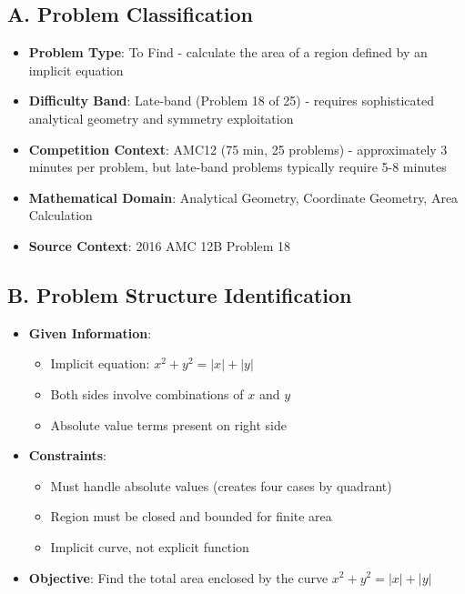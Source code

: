 \documentclass[]{article}
\begin{document}
\begin{problemconfigbox}
\subsection*{A. Problem Classification}
\begin{itemize}[leftmargin=*]
    \item \textbf{Problem Type}: To Find - calculate the area of a region defined by an implicit equation
    \item \textbf{Difficulty Band}: Late-band (Problem 18 of 25) - requires sophisticated analytical geometry and symmetry exploitation
    \item \textbf{Competition Context}: AMC12 (75 min, 25 problems) - approximately 3 minutes per problem, but late-band problems typically require 5-8 minutes
    \item \textbf{Mathematical Domain}: Analytical Geometry, Coordinate Geometry, Area Calculation
    \item \textbf{Source Context}: 2016 AMC 12B Problem 18
\end{itemize}

\subsection*{B. Problem Structure Identification}
\begin{itemize}[leftmargin=*]
    \item \textbf{Given Information}: 
    \begin{itemize}
        \item Implicit equation: $x^2+y^2=|x|+|y|$
        \item Both sides involve combinations of $x$ and $y$
        \item Absolute value terms present on right side
    \end{itemize}
    
    \item \textbf{Constraints}: 
    \begin{itemize}
        \item Must handle absolute values (creates four cases by quadrant)
        \item Region must be closed and bounded for finite area
        \item Implicit curve, not explicit function
    \end{itemize}
    
    \item \textbf{Objective}: Find the total area enclosed by the curve $x^2+y^2=|x|+|y|$
    

\end{itemize}
\end{problemconfigbox}
\end{document}
